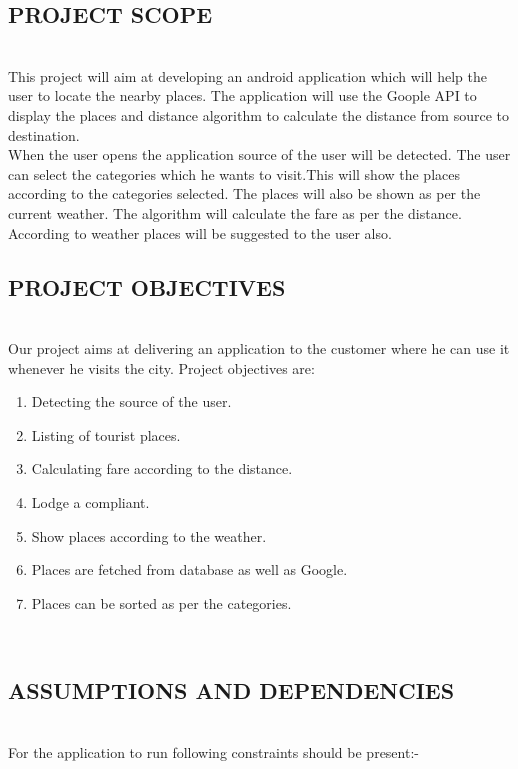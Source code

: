 \documentclass[12pt,a4paper]{article}
\begin{document}
\subsection{PROJECT SCOPE}
\\
\hspace{0.7 cm}This project will aim at developing an android application which will help the user to locate the nearby places. The application will use the Goople API to display the places and distance algorithm to calculate the distance from source to destination.
\\
\hspace{0.7 cm}When the user opens the application source of the user will be detected. The user can select the categories which he wants to visit.This will show the places according to the categories selected. The places will also be shown as per the current weather. The algorithm will calculate the fare as per the distance.
\\
\hspace{0.7 cm} According to weather places will be suggested to the user also.
\subsection{PROJECT OBJECTIVES}
\\
\hspace{0.7 cm}Our project aims at delivering an application to the customer where he can use it whenever he visits the city. Project objectives are:
\begin{enumerate}
\item Detecting the source of the user.
\\
\item Listing of tourist places.
\\
\item Calculating fare according to the distance.
\\
\item Lodge a compliant.
\\
\item Show places according to the weather.
\\
\item Places are fetched from database as well as Google.
\\
\item Places can be sorted as per the categories.
\end{enumerate}
\\
\subsection{ASSUMPTIONS AND DEPENDENCIES}
\\
\hspace{0.7 cm} For the application to run following constraints should be present:-
\end{document}
